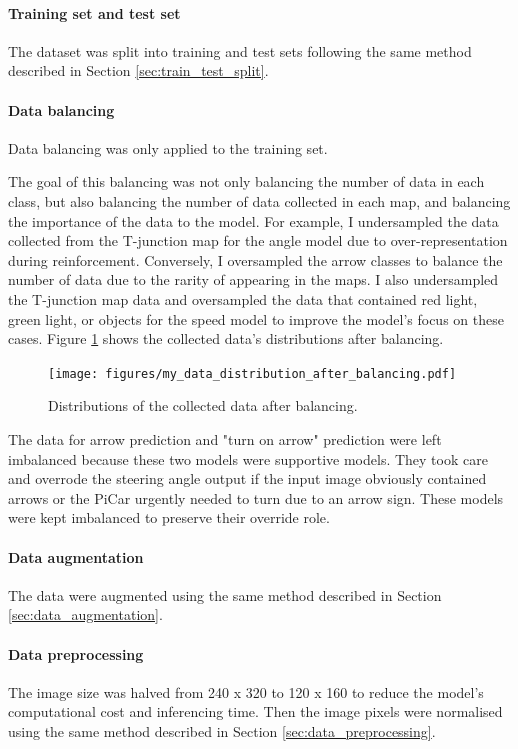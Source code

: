 \documentclass{article}
\begin{document}
\paragraph{Training set and test set}
The dataset was split into training and test sets following the same method described in Section \ref{sec:train_test_split}.

\paragraph{Data balancing}
Data balancing was only applied to the training set.

The goal of this balancing was not only balancing the number of data in each class, but also balancing the number of data collected in each map, and balancing the importance of the data to the model. For example, I undersampled the data collected from the T-junction map for the angle model due to over-representation during reinforcement. Conversely, I oversampled the arrow classes to balance the number of data due to the rarity of appearing in the maps. I also undersampled the T-junction map data and oversampled the data that contained red light, green light, or objects for the speed model to improve the model's focus on these cases. Figure \ref{fig:my_data_distribution_after_balancing} shows the collected data's distributions after balancing.

\begin{figure}[h]
  \centering
  \texttt{[image: figures/my\_data\_distribution\_after\_balancing.pdf]}
  \caption{Distributions of the collected data after balancing.}
  \label{fig:my_data_distribution_after_balancing}
\end{figure}

The data for arrow prediction and "turn on arrow" prediction were left imbalanced because these two models were supportive models. They took care and overrode the steering angle output if the input image obviously contained arrows or the PiCar urgently needed to turn due to an arrow sign. These models were kept imbalanced to preserve their override role.

\paragraph{Data augmentation}
The data were augmented using the same method described in Section \ref{sec:data_augmentation}.

\paragraph{Data preprocessing}
The image size was halved from 240 x 320 to 120 x 160 to reduce the model's computational cost and inferencing time. Then the image pixels were normalised using the same method described in Section \ref{sec:data_preprocessing}.
\end{document}
